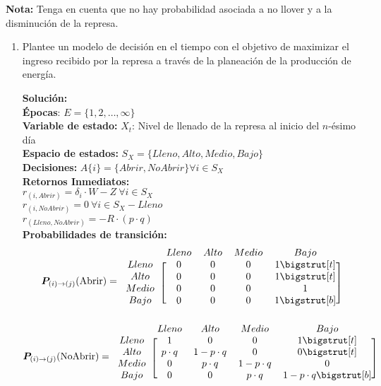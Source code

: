 \textbf{Nota:} Tenga en cuenta que no hay probabilidad asociada a no llover y a la disminución de la represa.
\begin{enumerate}
    \item Plantee un modelo de decisión en el tiempo con el objetivo de maximizar el ingreso recibido por la represa a través de la planeación de la producción de energía.

    \noindent \textbf{Solución:} \\

\noindent \textbf{Épocas}: $E=\{1,2,\dots, \infty\}$ \\
\textbf{Variable de estado:}
    $X_t$: Nivel de llenado de la represa al inicio del $n$-ésimo día\\
\textbf{Espacio de estados:}
    $S_X=\{Lleno, Alto, Medio, Bajo\}$ \\
\textbf{Decisiones:}
$A\{i\}=\{Abrir, No Abrir\} \forall i \in S_X$\\
\textbf{Retornos Inmediatos:}\\
$r_{(i,Abrir)} = \delta_i \cdot W - Z \ \forall i \in S_X$\\
$r_{(i,NoAbrir)} = 0  \ \forall i \in S_X -{Lleno}$ \\
$r_{(Lleno,NoAbrir)} =  - R\cdot (p\cdot q)$ \\
\noindent \textbf{Probabilidades de transición:} 
\begin{equation*}
    \bm{P}_{(i) \to (j)}(\text{Abrir}) =
    \begin{blockarray}{cccccc}
        & Lleno & Alto & Medio & Bajo \\
    \begin{block}{c[ccccc]}
    Lleno & 0& 0& 0&1\bigstrut[t] \\
    Alto & 0&0&0&1\bigstrut[t] \\
    Medio & 0& 0& 0& 1\\
    Bajo & 0&0& 0&1\bigstrut[b]\\
    \end{block}
    \end{blockarray}\vspace*{-1.25\baselineskip}
\end{equation*}
\begin{equation*}
    \bm{P}_{(i) \to (j)}(\text{NoAbrir}) =
    \begin{blockarray}{cccccc}
        & Lleno & Alto & Medio & Bajo \\
    \begin{block}{c[ccccc]}
    Lleno & 1& 0& 0&1\bigstrut[t] \\
    Alto & p\cdot q & 1 - p \cdot q &0&0\bigstrut[t] \\
    Medio & 0& p \cdot q & 1 - p \cdot q & 0\\
    Bajo & 0&0& p \cdot q &1 - p \cdot q\bigstrut[b]\\
    \end{block}
    \end{blockarray}\vspace*{-1.25\baselineskip}
\end{equation*}

\end{enumerate}

